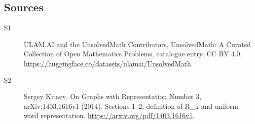 \documentclass[11pt]{article}
\begin{document}
\subsection{Sources}
\begin{description}
\item[\hypertarget{source:statement:1}{S1}] ULAM.AI and the UnsolvedMath Contributors, UnsolvedMath: A Curated Collection of Open Mathematics Problems, catalogue entry. CC BY 4.0. \url{https://huggingface.co/datasets/ulamai/UnsolvedMath}.
\item[\hypertarget{source:statement:2}{S2}] Sergey Kitaev, On Graphs with Representation Number 3, arXiv:1403.1616v1 (2014), Sections 1--2, definition of R\_k and uniform word representation. \url{https://arxiv.org/pdf/1403.1616v1}.
\end{description}
\label{end:statement}
\end{document}
